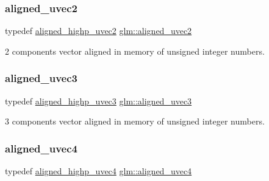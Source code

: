 \subsubsection{\texorpdfstring{aligned\+\_\+uvec2}{aligned\_uvec2}}
{\footnotesize\ttfamily typedef \mbox{\hyperlink{group__gtc__type__aligned_ga4497b2f3be81910c7a1bf632b51ac9a6}{aligned\+\_\+highp\+\_\+uvec2}} \mbox{\hyperlink{group__gtc__type__aligned_gacddd39189c2dedf7dd48c02155279124}{glm\+::aligned\+\_\+uvec2}}}



2 components vector aligned in memory of unsigned integer numbers. 

\mbox{\label{group__gtc__type__aligned_ga5dee635ca69be0f5de5630a59d89034f}} 
\subsubsection{\texorpdfstring{aligned\+\_\+uvec3}{aligned\_uvec3}}
{\footnotesize\ttfamily typedef \mbox{\hyperlink{group__gtc__type__aligned_ga1d303644825af6267389d6405f490ddc}{aligned\+\_\+highp\+\_\+uvec3}} \mbox{\hyperlink{group__gtc__type__aligned_ga5dee635ca69be0f5de5630a59d89034f}{glm\+::aligned\+\_\+uvec3}}}



3 components vector aligned in memory of unsigned integer numbers. 

\mbox{\label{group__gtc__type__aligned_ga1e0792f3c64836e042ee3aad9bd8209c}} 
\subsubsection{\texorpdfstring{aligned\+\_\+uvec4}{aligned\_uvec4}}
{\footnotesize\ttfamily typedef \mbox{\hyperlink{group__gtc__type__aligned_ga85553b476297f73c07bf3228ffb02d81}{aligned\+\_\+highp\+\_\+uvec4}} \mbox{\hyperlink{group__gtc__type__aligned_ga1e0792f3c64836e042ee3aad9bd8209c}{glm\+::aligned\+\_\+uvec4}}}



